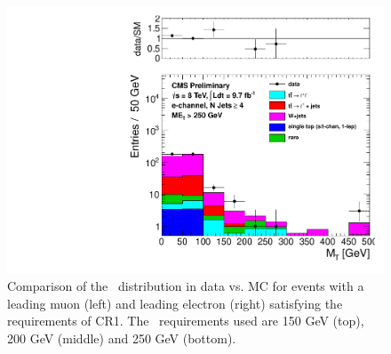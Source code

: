 \begin{figure}[hbt]
\begin{center}
        \includegraphics[width=0.5\linewidth]{plots/CR1plots/mt_met250_leadele_nj4.pdf}
    \caption{
      Comparison of the \mt\ distribution in data vs. MC for events
      with a leading muon (left) and leading electron (right)
      satisfying the requirements of CR1. The \met\ requirements used are
      150 GeV (top), 200 GeV (middle) and 250 GeV (bottom).
\label{fig:cr1mtrest} 
}  
      \end{center}
\end{figure}

\clearpage